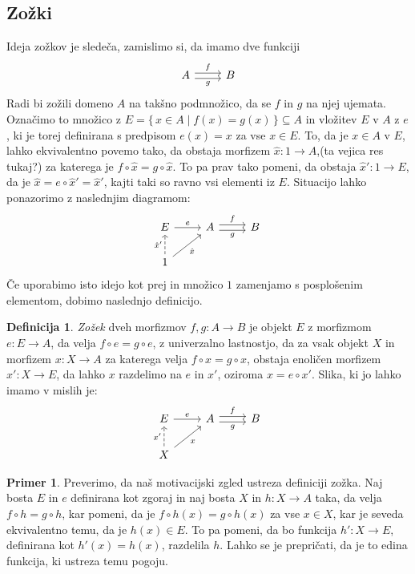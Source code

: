 \documentclass[12pt,a4paper]{book}
\theoremstyle{definition}
\newtheorem{definicija}{Definicija}[chapter]
\theoremstyle{plain}
\theoremstyle{definition}
\newtheorem{primer}{Primer}[section]
\theoremstyle{remark}
\renewcommand{\set}[1]{\{\,#1\,\}}
\begin{document}
\subsection{Zožki}
Ideja zožkov je sledeča, zamislimo si, da imamo dve funkciji
%
$$\begin{tikzcd}
A \ar[r, shift left, "f"] \ar[r, shift right, "g"'] & B 
\end{tikzcd}$$
%
Radi bi zožili domeno $A$ na takšno podmnožico, da se $f$ in $g$ na njej ujemata. Označimo to množico z $E = \set{x \in A \mid f(x) = g(x)} \subseteq A$ in vložitev $E$ v $A$ z $e$, ki je torej definirana s predpisom $e(x) = x$ za vse $x \in E$. To, da je $x \in A$ v $E$, lahko ekvivalentno povemo tako, da obstaja morfizem $\hat{x} : 1 \to A$,(ta vejica res tukaj?) za katerega je $f \circ \hat{x} = g \circ \hat{x}$. To pa prav tako pomeni, da obstaja $\hat{x}' : 1 \to E$, da je $\hat{x} = e \circ \hat{x}' = \hat{x}'$, kajti taki so ravno vsi elementi iz $E$. Situacijo lahko ponazorimo z naslednjim diagramom:
$$\begin{tikzcd}
E \ar[r, "e"] & A \ar[r, shift left, "f"] \ar[r, shift right, "g"'] & B \\
1 \ar[u, dashed, "\hat{x}'"] \ar[ur, "\hat{x}"']
\end{tikzcd}$$
Če uporabimo isto idejo kot prej in množico $1$ zamenjamo s posplošenim elementom, dobimo naslednjo definicijo.

\begin{definicija}
\emph{Zožek} dveh morfizmov $f, g : A \to B$ je objekt $E$ z morfizmom $e : E \to A$, da velja $f \circ e = g \circ e$, z univerzalno lastnostjo, da za vsak objekt $X$ in morfizem $x : X \to A$ za katerega velja $f \circ x = g \circ x$, obstaja enoličen morfizem $x' : X \to E$, da lahko $x$ razdelimo na $e$ in $x'$, oziroma $x = e \circ x'$.
Slika, ki jo lahko imamo v mislih je:
$$\begin{tikzcd}
E \ar[r, "e"] & A \ar[r, shift left, "f"] \ar[r, shift right, "g"'] & B \\
X \ar[u, dashed, "x'"] \ar[ur, "x"']
\end{tikzcd}$$

\end{definicija}

\begin{primer} \label{konstrukcija zozkov v Set}
Preverimo, da naš motivacijski zgled ustreza definiciji zožka. Naj bosta $E$ in $e$ definirana kot zgoraj in naj bosta $X$ in $h:X \to A$ taka, da velja $f \circ h = g \circ h$, kar pomeni, da je $f \circ h(x) = g \circ  h(x)$ za vse $x \in X$, kar je seveda ekvivalentno temu, da je $h(x) \in E$. To pa pomeni, da bo funkcija $h' : X \to E$, definirana kot $h'(x) = h(x)$, razdelila $h$. Lahko se je prepričati, da je to edina funkcija, ki ustreza temu pogoju.
\end{primer}
\end{document}
